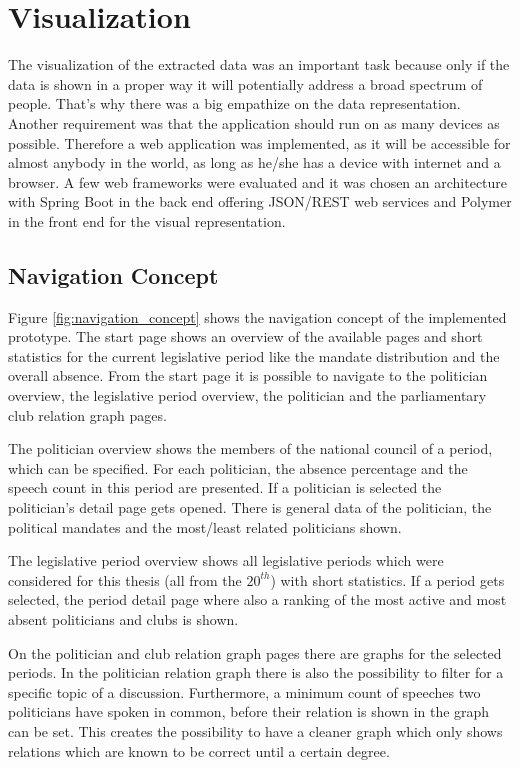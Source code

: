 
\section{Visualization}
\label{sec:visualization}
The visualization of the extracted data was an important task because only if the data is shown in a proper way it will potentially address a broad spectrum of people. That's why there was a big empathize on the data representation. Another requirement was that the application should run on as many devices as possible. Therefore a web application was implemented, as it will be accessible for almost anybody in the world, as long as he/she has a device with internet and a browser. A few web frameworks were evaluated and it was chosen an architecture with Spring Boot in the back end offering JSON/REST web services and Polymer in the front end for the visual representation.


\subsection{Navigation Concept}
Figure \ref{fig:navigation_concept} shows the navigation concept of the implemented prototype. The start page shows an overview of the available pages and short statistics for the current legislative period like the mandate distribution and the overall absence. From the start page it is possible to navigate to the politician overview, the legislative period overview, the politician and the parliamentary club relation graph pages. 

The politician overview shows the members of the national council of a period, which can be specified. For each politician, the absence percentage and the speech count in this period are presented. If a politician is selected the politician's detail page gets opened. There is general data of the politician, the political mandates and the most/least related politicians shown.

The legislative period overview shows all legislative periods which were considered for this thesis (all from the $20^{th}$) with short statistics. If a period gets selected, the period detail page where also a ranking of the most active and most absent politicians and clubs is shown.

On the politician and club relation graph pages there are graphs for the selected periods. In the politician relation graph there is also the possibility to filter for a specific topic of a discussion. Furthermore, a minimum count of speeches two politicians have spoken in common, before their relation is shown in the graph can be set. This creates the possibility to have a cleaner graph which only shows relations which are known to be correct until a certain degree.

